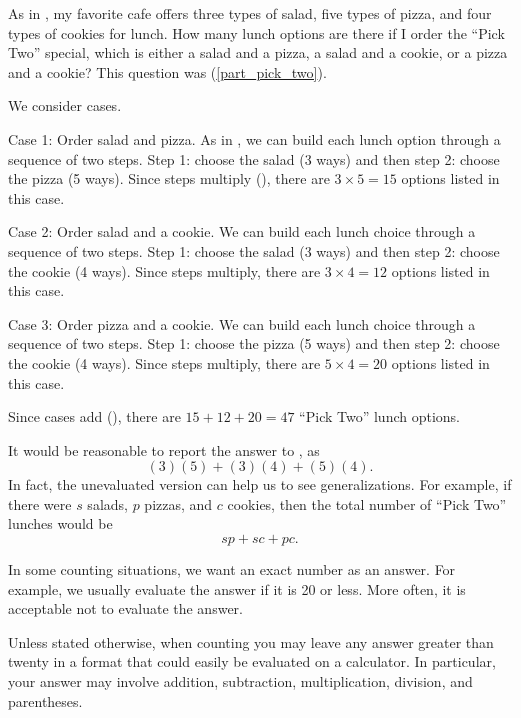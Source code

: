 \begin{exam} 
\label{exam_pick_two_lunch}
    As in , my favorite cafe offers three types of salad, five types of pizza, and four types of cookies for lunch.  How many lunch options are there if I order the ``Pick Two'' special, which is either a salad and a pizza, a salad and a cookie, or a pizza and a cookie?  This question was (\ref{part_pick_two}).

    \begin{soln}
        We consider cases.  

        Case 1: Order salad and pizza.  As in , we can build each lunch option through a sequence of two steps.  Step 1: choose the salad (3 ways) and then step 2: choose the pizza (5 ways).  Since steps multiply (), there are $3 \times 5 = 15$ options listed in this case.

        Case 2: Order salad and a cookie.  We can build each lunch choice through a sequence of two steps.  Step 1: choose the salad (3 ways) and then step 2: choose the cookie (4 ways).  Since steps multiply, there are $3 \times 4 = 12$ options listed in this case.    

        Case 3: Order pizza and a cookie.  We can build each lunch choice through a sequence of two steps.  Step 1: choose the pizza (5 ways) and then step 2: choose the cookie (4 ways).  Since steps multiply, there are $5 \times 4 = 20$ options listed in this case. 

        Since cases add (), there are $15+12+20 = 47$ ``Pick Two'' lunch options.
    \end{soln}
\end{exam}

It would be reasonable to report the answer to ,  as
$$(3)(5) + (3)(4) + (5)(4).$$
In fact, the unevaluated version can help us to see generalizations.  For example, if there were $s$ salads, $p$ pizzas, and $c$ cookies, then the total number of ``Pick Two'' lunches would be 
$$sp + sc + pc.$$
    
In some counting situations, we want an exact number as an answer. For example, we usually evaluate the answer if it is 20 or less. More often, it is acceptable not to evaluate the answer.  

\begin{rem} 
\label{rem_not_eval_counts_1}
Unless stated otherwise, when counting you may leave any answer greater than twenty in a format that could easily be evaluated on a calculator. In particular, your answer may involve addition, subtraction, multiplication, division, and parentheses.
\end{rem}

